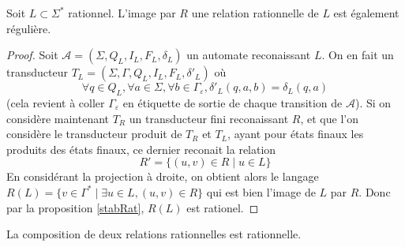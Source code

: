 \documentclass{scrartcl}
\begin{document}
\begin{flushleft}
\begin{prop} \label{imageRat}
    Soit $L \subset \Sigma^*$ rationnel. L'image par $R$ une relation rationnelle de $L$ est également régulière.
\end{prop}

\begin{proof}
    Soit $\mathcal{A} = (\Sigma, Q_L, I_L, F_L, \delta_L)$ un automate reconaissant $L$. On en fait un transducteur
    $T_L = (\Sigma, \Gamma, Q_L, I_L, F_L, \delta'_L)$ où
    \[ \forall q \in Q_L, \forall a \in \Sigma, \forall b \in \Gamma_{\varepsilon}, \delta'_L(q, a, b) = \delta_L(q, a) \]
    (cela revient à coller $\Gamma_{\varepsilon}$ en étiquette de sortie de chaque transition de $\mathcal{A}$). Si on considère
    maintenant $T_R$ un transducteur fini reconaissant $R$, et que l'on considère le transducteur produit de $T_R$ et $T_L$,
    ayant pour états finaux les produits des états finaux, ce dernier reconait la relation
    \[ R' = \{ (u, v) \in R \mid u \in L \} \]
    En considérant la projection à droite, on obtient alors le langage $R(L) = \{ v \in \Gamma^* \mid \exists u \in L, (u, v) \in R \}$
    qui est bien l'image de $L$ par $R$. Donc par la proposition \ref{stabRat}, $R(L)$ est rationel.
\end{proof}

\begin{prop}[Composition]
    La composition de deux relations rationnelles est rationnelle.
\end{prop}


\end{flushleft}
\end{document}
